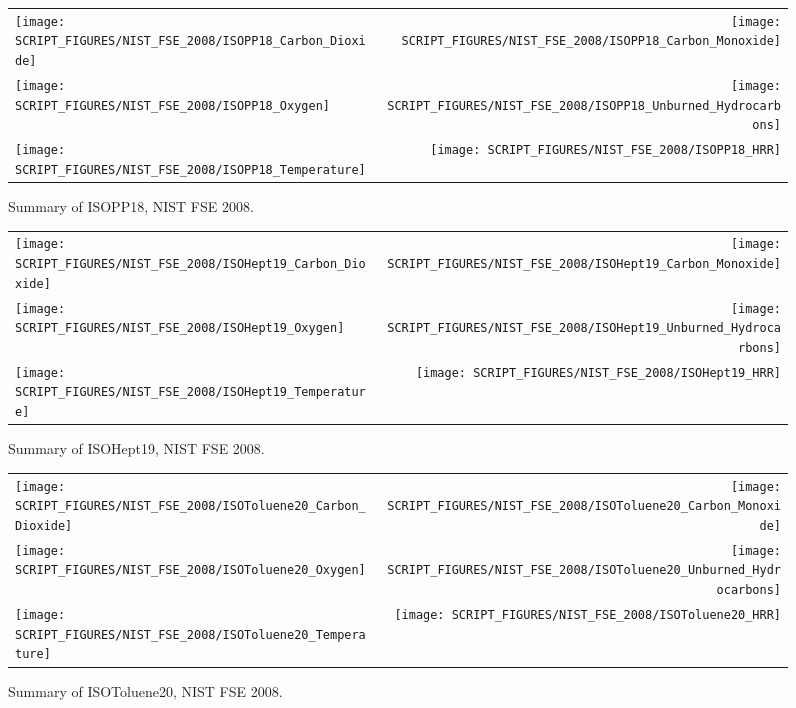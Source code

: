 \begin{figure}[p]
\begin{tabular*}{\textwidth}{l@{\extracolsep{\fill}}r}
\texttt{[image: SCRIPT\_FIGURES/NIST\_FSE\_2008/ISOPP18\_Carbon\_Dioxide]} &
\texttt{[image: SCRIPT\_FIGURES/NIST\_FSE\_2008/ISOPP18\_Carbon\_Monoxide]} \\
\texttt{[image: SCRIPT\_FIGURES/NIST\_FSE\_2008/ISOPP18\_Oxygen]} &
\texttt{[image: SCRIPT\_FIGURES/NIST\_FSE\_2008/ISOPP18\_Unburned\_Hydrocarbons]} \\
\texttt{[image: SCRIPT\_FIGURES/NIST\_FSE\_2008/ISOPP18\_Temperature]} &
\texttt{[image: SCRIPT\_FIGURES/NIST\_FSE\_2008/ISOPP18\_HRR]}
\end{tabular*}
\caption[Summary of ISOPP18, NIST FSE 2008]{Summary of ISOPP18, NIST FSE 2008.}
\label{NIST_FSE_1994_ISOPP18}
\end{figure}

\begin{figure}[p]
\begin{tabular*}{\textwidth}{l@{\extracolsep{\fill}}r}
\texttt{[image: SCRIPT\_FIGURES/NIST\_FSE\_2008/ISOHept19\_Carbon\_Dioxide]} &
\texttt{[image: SCRIPT\_FIGURES/NIST\_FSE\_2008/ISOHept19\_Carbon\_Monoxide]} \\
\texttt{[image: SCRIPT\_FIGURES/NIST\_FSE\_2008/ISOHept19\_Oxygen]} &
\texttt{[image: SCRIPT\_FIGURES/NIST\_FSE\_2008/ISOHept19\_Unburned\_Hydrocarbons]} \\
\texttt{[image: SCRIPT\_FIGURES/NIST\_FSE\_2008/ISOHept19\_Temperature]} &
\texttt{[image: SCRIPT\_FIGURES/NIST\_FSE\_2008/ISOHept19\_HRR]}
\end{tabular*}
\caption[Summary of ISOHept19, NIST FSE 2008]{Summary of ISOHept19, NIST FSE 2008.}
\label{NIST_FSE_1994_ISOHept19}
\end{figure}

\begin{figure}[p]
\begin{tabular*}{\textwidth}{l@{\extracolsep{\fill}}r}
\texttt{[image: SCRIPT\_FIGURES/NIST\_FSE\_2008/ISOToluene20\_Carbon\_Dioxide]} &
\texttt{[image: SCRIPT\_FIGURES/NIST\_FSE\_2008/ISOToluene20\_Carbon\_Monoxide]} \\
\texttt{[image: SCRIPT\_FIGURES/NIST\_FSE\_2008/ISOToluene20\_Oxygen]} &
\texttt{[image: SCRIPT\_FIGURES/NIST\_FSE\_2008/ISOToluene20\_Unburned\_Hydrocarbons]} \\
\texttt{[image: SCRIPT\_FIGURES/NIST\_FSE\_2008/ISOToluene20\_Temperature]} &
\texttt{[image: SCRIPT\_FIGURES/NIST\_FSE\_2008/ISOToluene20\_HRR]}
\end{tabular*}
\caption[Summary of ISOToluene20, NIST FSE 2008]{Summary of ISOToluene20, NIST FSE 2008.}
\label{NIST_FSE_1994_ISOToluene20}
\end{figure}

